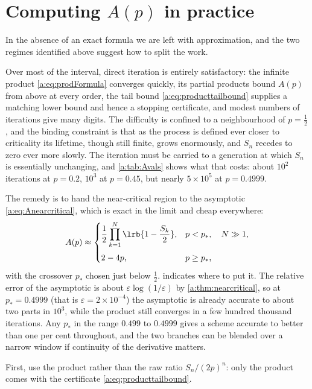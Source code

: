 \section{Computing \texorpdfstring{$A(p)$}{A(p)} in practice}
\label{a:sec:practical}

In the absence of an exact formula we are left with approximation, and the two
regimes identified above suggest how to split the work.

Over most of the interval, direct iteration is entirely satisfactory: the infinite
product \cref{a:eq:prodFormula} converges quickly, its partial products bound $A(p)$
from above at every order, the tail bound \cref{a:eq:producttailbound} supplies a
matching lower bound and hence a stopping certificate, and modest numbers of
iterations give many digits. The difficulty is confined to a neighbourhood of
$p=\tfrac12$, and the binding constraint is that as the process is
defined ever closer to criticality its lifetime, though still finite, grows
enormously, and $S_n$ recedes to zero ever more slowly. The iteration must be
carried to a generation at which $S_n$ is essentially unchanging, and
\cref{a:tab:Avals} shows what that costs: about $10^2$ iterations at $p=0.2$,
$10^3$ at $p=0.45$, but nearly $5\times10^5$ at $p=0.4999$.

The remedy is to hand the near-critical region to the asymptotic
\cref{a:eq:Anearcritical}, which is exact in the limit and cheap everywhere:
\begin{equation}
\label{a:eq:Apractical}
A(p) \approx
\begin{cases}
\displaystyle \frac12\prod_{k=1}^{N}\lrb{1-\frac{S_k}{2}}, & p<p_\ast,\quad N\gg1,\\[14pt]
2-4p, & p\ge p_\ast,
\end{cases}
\end{equation}
with the crossover $p_\ast$ chosen just below $\tfrac12$. 
indicates where to put it. The relative error of the asymptotic is about
$\varepsilon\log(1/\varepsilon)$ by \cref{a:thm:nearcritical}, so at
$p_\ast = 0.4999$ (that is $\varepsilon = 2\times10^{-4}$) the asymptotic is already
accurate to about two parts in $10^3$, while the product still converges in a few
hundred thousand iterations. Any $p_\ast$ in the range $0.499$ to $0.4999$ gives a
scheme accurate to better than one per cent throughout, and the two branches can be
blended over a narrow window if continuity of the derivative matters.

First, use the product rather than the raw ratio $S_n/(2p)^n$: only the product
comes with the certificate \cref{a:eq:producttailbound}.

